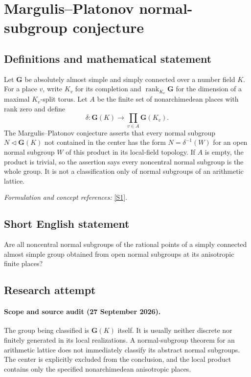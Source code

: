 \documentclass[11pt]{article}
\begin{document}
\section*{\texorpdfstring{Margulis–Platonov normal-subgroup conjecture}{Margulis–Platonov normal-subgroup conjecture}}\label{394}
\subsection{Definitions and mathematical statement}
Let $\mathbf G$ be absolutely almost simple and simply connected over a number field $K$. For a place $v$, write $K_v$ for its completion and $\operatorname{rank}_{K_v}\mathbf G$ for the dimension of a maximal $K_v$-split torus. Let $A$ be the finite set of nonarchimedean places with rank zero and define
\[
 \delta:\mathbf G(K)\longrightarrow\prod_{v\in A}\mathbf G(K_v).
\]
The Margulis--Platonov conjecture asserts that every normal subgroup $N\triangleleft\mathbf G(K)$ not contained in the center has the form $N=\delta^{-1}(W)$ for an open normal subgroup $W$ of this product in its local-field topology. If $A$ is empty, the product is trivial, so the assertion says every noncentral normal subgroup is the whole group. It is not a classification only of normal subgroups of an arithmetic lattice.
\par\smallskip\textit{Formulation and concept references:} \href{https://arxiv.org/html/2603.27472}{[S1]}.

\subsection{Short English statement}
Are all noncentral normal subgroups of the rational points of a simply connected almost simple group obtained from open normal subgroups at its anisotropic finite places?
\subsection{Research attempt}
\paragraph{Scope and source audit (27 September 2026).}
The group being classified is $\mathbf G(K)$ itself. It is usually
neither discrete nor finitely generated in its local realizations.
A normal-subgroup theorem for an arithmetic lattice does not immediately
classify its abstract normal subgroups. The center is explicitly excluded
from the conclusion, and the local product contains only the specified
nonarchimedean anisotropic places.
\end{document}
